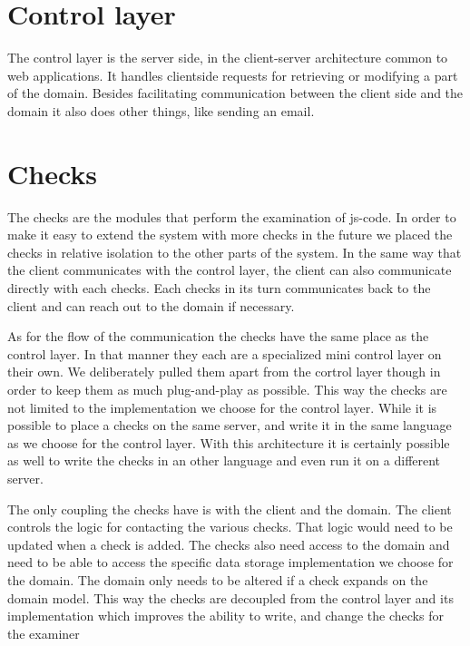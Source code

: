 \section{Control layer}
The control layer is the server side,
in the client-server architecture common to web applications.
It handles clientside requests
for retrieving or modifying a part of the domain.
Besides facilitating communication between the client side and the domain
it also does other things, like sending an email.

\section{Checks}
The \glspl{check} are the modules that perform the examination of \gls{js-code}.
In order to make it easy to extend the system with more \glspl{check} in the future
we placed the \glspl{check} in relative isolation to the other parts of the system.
In the same way that the client communicates with the control layer,
the client can also communicate directly with each \glspl{check}.
Each \glspl{check} in its turn communicates back to the client
and can reach out to the domain if necessary.

As for the flow of the communication
the \glspl{check} have the same place as the control layer.
In that manner they each are a specialized mini control layer on their own.
We deliberately pulled them apart from the cortrol layer though
in order to keep them as much plug-and-play as possible.
This way the \glspl{check} are not limited
to the implementation we choose for the control layer.
While it is possible to place a \glspl{check} on the same server,
and write it in the same language as we choose for the control layer.
With this architecture it is certainly possible as well
to write the \glspl{check} in an other language
and even run it on a different server.

The only coupling the \glspl{check} have is with the client and the domain.
The client controls the logic for contacting the various \glspl{check}.
That logic would need to be updated when a \gls{check} is added.
The \glspl{check} also need access to the domain
and need to be able to access
the specific data storage implementation we choose for the domain.
The domain only needs to be altered if a \gls{check} expands on the domain model.
This way the \glspl{check} are decoupled from the control layer
and its implementation
which improves the ability to write,
and change the \glspl{check} for the \gls{examiner}

